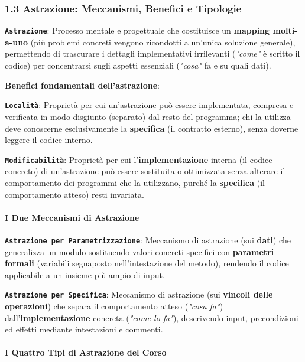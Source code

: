 \subsubsection{1.3 Astrazione: Meccanismi, Benefici e Tipologie}\label{1-3-astrazione-meccanismi-benefici-e-tipologie}

\textbf{\texttt{Astrazione}}: Processo mentale e progettuale che costituisce un \textbf{mapping molti-a-uno} (più problemi concreti vengono ricondotti a un'unica soluzione generale), permettendo di trascurare i dettagli implementativi irrilevanti (\emph{"come"} è scritto il codice) per concentrarsi sugli aspetti essenziali (\emph{"cosa"} fa e su quali dati).

\textbf{Benefici fondamentali dell'astrazione}:

\textbf{\texttt{Località}}: Proprietà per cui un'astrazione può essere implementata, compresa e verificata in modo disgiunto (separato) dal resto del programma; chi la utilizza deve conoscerne esclusivamente la \textbf{specifica} (il contratto esterno), senza doverne leggere il codice interno.

\textbf{\texttt{Modificabilità}}: Proprietà per cui l'\textbf{implementazione} interna (il codice concreto) di un'astrazione può essere sostituita o ottimizzata senza alterare il comportamento dei programmi che la utilizzano, purché la \textbf{specifica} (il comportamento atteso) resti invariata.

\paragraph{I Due Meccanismi di Astrazione}\label{i-due-meccanismi-di-astrazione}

\textbf{\texttt{Astrazione per Parametrizzazione}}: Meccanismo di astrazione (sui \textbf{dati}) che generalizza un modulo sostituendo valori concreti specifici con \textbf{parametri formali} (variabili segnaposto nell'intestazione del metodo), rendendo il codice applicabile a un insieme più ampio di input.

\textbf{\texttt{Astrazione per Specifica}}: Meccanismo di astrazione (sui \textbf{vincoli delle operazioni}) che separa il comportamento atteso (\emph{"cosa fa"}) dall'\textbf{implementazione} concreta (\emph{"come lo fa"}), descrivendo input, precondizioni ed effetti mediante intestazioni e commenti.

\paragraph{I Quattro Tipi di Astrazione del Corso}\label{i-quattro-tipi-di-astrazione-del-corso}


